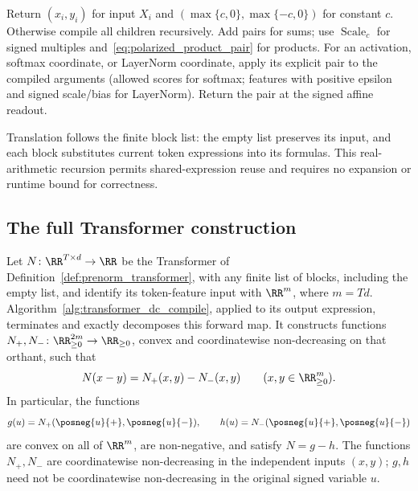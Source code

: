 \begin{algorithm}[htbp]
\DontPrintSemicolon
\caption{Recursive DC evaluation of a finite Transformer expression}
\label{alg:transformer_dc_compile}
Return $(x_i,y_i)$ for input $X_i$ and $(\max\{c,0\},\max\{-c,0\})$ for constant $c$.\;
Otherwise compile all children recursively. Add pairs for sums; use $\operatorname{Scale}_c$ for signed multiples and~\eqref{eq:polarized_product_pair} for products.\;
For an activation, softmax coordinate, or LayerNorm coordinate, apply its explicit pair to the compiled arguments (allowed scores for softmax; features with positive epsilon and signed scale/bias for LayerNorm).\;
Return the pair at the signed affine readout.\;
\end{algorithm}

Translation follows the finite block list: the empty list preserves its input, and each block substitutes current token expressions into its formulas. This real-arithmetic recursion permits shared-expression reuse and requires no expansion or runtime bound for correctness.

\subsection{The full Transformer construction}

\begin{theoremenv}\label{thm:transformer_dc}
Let $N\colon\RR^{T\times d}\to\RR$ be the Transformer of Definition~\ref{def:prenorm_transformer}, with any finite list of blocks, including the empty list, and identify its token-feature input with $\RR^m$, where $m=Td$. Algorithm~\ref{alg:transformer_dc_compile}, applied to its output expression, terminates and exactly decomposes this forward map. It constructs functions
$N_+,N_-\colon\RR^{2m}_{\ge0}\to\RR_{\ge0}$,
convex and coordinatewise non-decreasing on that orthant, such that
\begin{equation}
    N(x-y)=N_+(x,y)-N_-(x,y)
    \qquad(x,y\in\RR^m_{\ge0}).
    \label{eq:transformer_dc_recovery}
\end{equation}
In particular, the functions
\begin{equation}
    g(u)=N_+(\posneg{u}{+},\posneg{u}{-}),\qquad
    h(u)=N_-(\posneg{u}{+},\posneg{u}{-})
    \label{eq:transformer_raw_dc}
\end{equation}
are convex on all of $\RR^m$, are non-negative, and satisfy $N=g-h$. The functions $N_+,N_-$ are coordinatewise non-decreasing in the independent inputs $(x,y)$; $g,h$ need not be coordinatewise non-decreasing in the original signed variable $u$.
\end{theoremenv}

